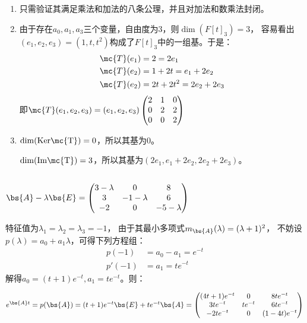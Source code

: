 \documentclass[12pt, a4paper, oneside, UTF8]{ctexbook}
\begin{document}
\subsection{}
\begin{enumerate}
\item 只需验证其满足乘法和加法的八条公理，并且对加法和数乘法封闭。
\item 由于存在$a_0,a_1,a_3$三个变量，自由度为3，则$\dim{(F[t]_3)}=3$，
容易看出$(e_1,e_2,e_3)=(1,t,t^2)$构成了$F[t]_3$中的一组基。于是：
\begin{align*}
\mc{T}(e_1)&=2=2e_1 \\
\mc{T}(e_2)&=1+2t=e_1+2e_2 \\
\mc{T}(e_2)&=2t+2t^2=2e_2+2e_3
\end{align*}
即$\mc{T}(e_1,e_2,e_3)=(e_1,e_2,e_3)
\begin{pmatrix}
2 & 1 & 0 \\
0 & 2 & 2 \\
0 & 0 & 2      
\end{pmatrix}$

\item $\dim(\rm{Ker}\mc{T})=0$，所以其基为$0$。

$\dim(\rm{Im}\mc{T})=3$，所以其基为$(2e_1,e_1+2e_2,2e_2+2e_3)$。

\end{enumerate}
\subsection{}
$\bs{A}-\lambda\bs{E}=\begin{pmatrix}
3-\lambda& 0& 8 \\
3& -1-\lambda& 6 \\
-2& 0 &-5-\lambda
\end{pmatrix}$

特征值为$\lambda_1=\lambda_2=\lambda_3=-1$，
由于其最小多项式$m_{\bs{A}}(\lambda)=(\lambda+1)^2$，
不妨设$p(\lambda)=a_0+a_1\lambda$，可得下列方程组：
\begin{align*}
p(-1)&=a_0-a_1=e^{-t} \\
p'(-1)&=a_1=te^{-t}
\end{align*}
解得$a_0=(t+1)e^{-t},a_1=te^{-t}$。则：

$e^{\bs{A}t}=p(\bs{A})=
(t+1)e^{-t}\bs{E}+te^{-t}\bs{A}=\begin{pmatrix}
    (4t+1)e^{-t} & 0 & 8te^{-t} \\
    3te^{-t} & te^{-t} & 6te^{-t} \\
    -2te^{-t}& 0 &(1-4t)e^{-t}
\end{pmatrix}    $
\end{document}
